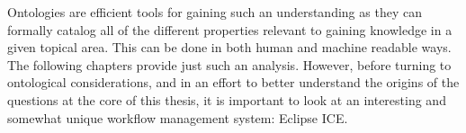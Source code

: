 Ontologies are efficient tools for gaining such an understanding as they
can formally catalog all of the different properties relevant to gaining
knowledge in a given topical area. This can be done in both human and machine
readable ways. The following chapters provide just such an analysis. However,
before turning to ontological considerations, and in an effort to better
understand the origins of the questions at the core of this thesis, it is
important to look at an interesting and somewhat unique workflow management
system: Eclipse ICE.

